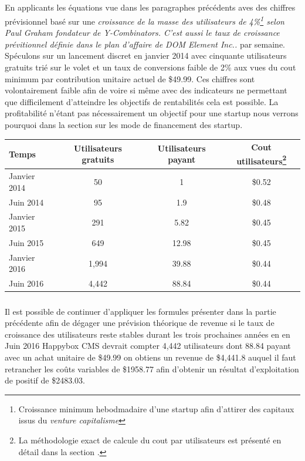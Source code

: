 \documentclass[11pt, a4paper ]{article}
\begin{document}
\begin{spacing}{1.5}
\begin{flushleft}
\begin{tabular}{|l|l|l|l|}
	\end{tabular}
\end{flushleft}
\subparagraph{}
En applicants les équations vue dans les paragraphes précédents aves des chiffres prévisionnel basé sur une \emph{croissance de la masse des utilisateurs de 4\%\footnote{Croissance minimum hebodmadaire d'une startup afin d'attirer des capitaux issus du \emph{venture capitalisme}} selon Paul Graham fondateur de Y-Combinators. C'est aussi le taux de croissance prévitionnel définie dans le plan d'affaire de DOM Element Inc..} par semaine.
Spéculons sur un lancement discret en janvier 2014 avec cinquante utilisateurs gratuits trié sur le volet et un taux de conversions faible de 2\% aux vues du cout minimum par contribution unitaire actuel de \$49.99. Ces chiffres sont volontairement faible afin de voire si même avec des indicateurs ne permettant que difficilement d'atteindre les objectifs de rentabilités cela est possible. La profitabilité n'étant pas nécessairement un objectif pour une startup nous verrons pourquoi dans la section sur les mode de financement des startup.


\begin{center}
	\begin{tabular}{|l||c|c|c|}
		Temps & Utilisateurs gratuits & Utilisateurs payant & Cout utilisateurs\footnote{La méthodologie exact de calcule du cout par utilisateurs est présenté en détail dans la section .}\\ %
		\hline
		Janvier 2014 & 50 & 1 & \$0.52 \\
		Juin 2014 & 95 & 1.9 & \$0.48 \\
		Janvier 2015 & 291 & 5.82 & \$0.45 \\
		Juin 2015 & 649 & 12.98 & \$0.45 \\
		Janvier 2016 & 1,994 & 39.88 & \$0.44 \\
		Juin 2016 & 4,442 & 88.84 & \$0.44 \\
	\end{tabular}
\end{center}



\subparagraph{}
Il est possible de continuer d'appliquer les formules présenter dans la partie précédente afin de dégager une prévision théorique de revenue si le taux de croissance des utilisateurs reste stables durant les trois prochaines années en en Juin 2016 Happybox CMS devrait compter 4,442 utilisateurs dont 88.84 payant avec un achat unitaire de \$49.99 on obtiens un revenue de \$4,441.8 auquel il faut retrancher les coûts variables de \$1958.77 afin d'obtenir un résultat d'exploitation de positif de \$2483.03.


\end{spacing}
\end{document}
